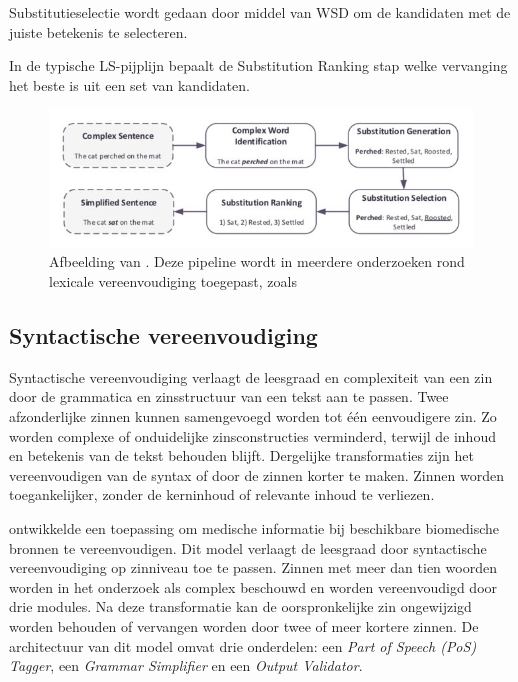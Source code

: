 Substitutieselectie wordt gedaan door middel van WSD om de kandidaten met de juiste betekenis te selecteren. 

In de typische LS-pijplijn bepaalt de Substitution Ranking stap welke vervanging het beste is uit een set van kandidaten.

\begin{figure}[H]
	\includegraphics{img/lexical-simplification-pipeline.png}
	\caption{Afbeelding van \textcite{Althunayyan2021}. Deze pipeline wordt in meerdere onderzoeken rond lexicale vereenvoudiging toegepast, zoals \textcite{Paetzold2016, Bingel2018, Bulte2018}}
\end{figure}



\subsection{Syntactische vereenvoudiging}

Syntactische vereenvoudiging verlaagt de leesgraad en complexiteit van een zin door de grammatica en zinsstructuur van een tekst aan te passen. Twee afzonderlijke zinnen kunnen samengevoegd worden tot één eenvoudigere zin. Zo worden complexe of onduidelijke zinsconstructies verminderd, terwijl de inhoud en betekenis van de tekst behouden blijft. Dergelijke transformaties zijn het vereenvoudigen van de syntax of door de zinnen korter te maken. Zinnen worden toegankelijker, zonder de kerninhoud of relevante inhoud te verliezen.

\textcite{Kandula2010} ontwikkelde een toepassing om medische informatie bij beschikbare biomedische bronnen te vereenvoudigen. Dit model verlaagt de leesgraad door syntactische vereenvoudiging op zinniveau toe te passen. Zinnen met meer dan tien woorden worden in het onderzoek als complex beschouwd en worden vereenvoudigd door drie modules. Na deze transformatie kan de oorspronkelijke zin ongewijzigd worden behouden of vervangen worden door twee of meer kortere zinnen. De architectuur van dit model omvat drie onderdelen: een \textit{Part of Speech (PoS) Tagger}, een \textit{Grammar Simplifier} en een \textit{Output Validator}. 

